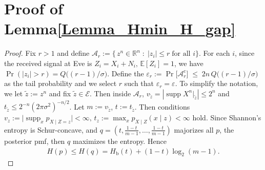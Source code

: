 \documentclass[onecolumn]{IEEEtran} %
\newcommand{\1}{\mathbbm{1}}
\theoremstyle{boldremark}
\DeclareMathOperator{\supp}{supp}
\begin{document}
\section{Proof of Lemma\ref{Lemma_Hmin_H_gap}}\label{APP_proof_LHL_cond_entropy}
\begin{proof}
Fix $r>1$ and define $
  \mathcal A_{r}:=
     \bigl\{\, {z}^{n}\in\mathbb R^{n}\;:\;
             | {z}_i|\le r \;\text{for all } i\bigr\}.$
For each $i$, since the received signal at Eve is \( {Z}_i = X_i+N_i,\,\mathds{E}[ {Z}_i]=1\), we have
\(
  \Pr(| {z}_i|>r) = Q\!\bigl((r-1)/\sigma\bigr).
\)
Define the $
  \varepsilon_{r}
  := \Pr\bigl[\mathcal A_{r}^{\mathrm c}\bigr]
  \;\le\;
  2n\,Q\!\bigl((r-1)/\sigma\bigr)$ as the tail probability and we select $r$ such that $\varepsilon_{r}=\varepsilon$. To simplify the notation, we let $\tilde{z}:= {z}^n$ and fix \( \tilde{z}\in\mathcal E\). Then inside $\mathcal A_{r}$, \(v_{ \tilde{z}}=|\supp X^{n}\big|_{ \tilde{z}}|\le 2^{n}\) and \(t_{ \tilde{z}}\le 2^{-n}(2\pi\sigma^{2})^{-n/2}\). Let \(m:=v_{ \tilde{z}}\), \(t:=t_{ \tilde{z}}\). Then conditions $v_{z}\!:=\!\bigl|\supp_x p_{X\mid Z=z}\bigr|\!<\!\infty,   \,   t_{z}:=\max_{x}p_{X\mid Z}(x\mid z)\!<\!\infty$ hold. Since Shannon's entropy is Schur-concave, and
$   q=(t,\tfrac{1-t}{m-1},\ldots,\tfrac{1-t}{m-1})$ majorizes all $p$, the posterior \gls{pmf}, then $q$ maximizes the entropy. Hence
\begin{align}\label{EQ_schur_convex}
    H(p)\le H(q)=H_{\mathrm b}(t)+(1-t)\log_2(m-1).    
\end{align}


\end{proof}
\end{document}
